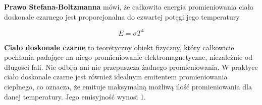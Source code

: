 \vspace{12pt}

\textbf{Prawo Stefana-Boltzmanna} mówi, że całkowita energia promieniowania ciała doskonale czarnego jest proporcjonalna do czwartej potęgi jego temperatury

\vspace{12pt}

\begin{equation}
    E = \sigma T^4
\end{equation}






\textbf{Ciało doskonale czarne} to teoretyczny obiekt fizyczny, który całkowicie pochłania padające na niego promieniowanie elektromagnetyczne, niezależnie od długości fali. Nie odbija ani nie przepuszcza żadnego promieniowania. W praktyce ciało doskonale czarne jest również idealnym emitentem promieniowania cieplnego, co oznacza, że emituje maksymalną możliwą ilość promieniowania dla danej temperatury. Jego emisyjność wynosi 1.

